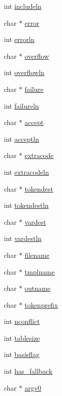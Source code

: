 \begin{DoxyCompactItemize}
\item 
int \hyperlink{structlemon_ac04c5942002ee2221e33a432823c8e21}{includeln}
\item 
char $\ast$ \hyperlink{structlemon_a294f54d8e2db01b97128787f4fcaf663}{error}
\item 
int \hyperlink{structlemon_a4c5c22017ce6a6349580508013f0fef8}{errorln}
\item 
char $\ast$ \hyperlink{structlemon_a9e2f1ac643c894788e3833d66cf96467}{overflow}
\item 
int \hyperlink{structlemon_acc8a35189944152a02bbf4fc07911089}{overflowln}
\item 
char $\ast$ \hyperlink{structlemon_a2c5a51191c4df555486145f8d4a2d655}{failure}
\item 
int \hyperlink{structlemon_a1dca070f96c372bb30989cfc29b59485}{failureln}
\item 
char $\ast$ \hyperlink{structlemon_ae26bcb5ffb57001afb97871a54a4013e}{accept}
\item 
int \hyperlink{structlemon_a0bd3f987e1b5b51e4fefde9c9ff44e17}{acceptln}
\item 
char $\ast$ \hyperlink{structlemon_ac4795352f79823338f9eb6861e996b24}{extracode}
\item 
int \hyperlink{structlemon_ab9289aa74679e3a53540eefebd30484e}{extracodeln}
\item 
char $\ast$ \hyperlink{structlemon_a13e8e51c24bb346fd0d4130037e47674}{tokendest}
\item 
int \hyperlink{structlemon_a2cd0d2dca6fa9656edde10e519bee495}{tokendestln}
\item 
char $\ast$ \hyperlink{structlemon_a218d36617729ba9fda8ff23c6134808c}{vardest}
\item 
int \hyperlink{structlemon_aa924e36c604bf2f4478808693c3f06f0}{vardestln}
\item 
char $\ast$ \hyperlink{structlemon_a2b5f99613de48854dc417a6ad07efc71}{filename}
\item 
char $\ast$ \hyperlink{structlemon_acd2bfd77e462d13f75fb6d85bce8ee8d}{tmplname}
\item 
char $\ast$ \hyperlink{structlemon_a6f5387bcd6ed98e3e0455b4ef410b699}{outname}
\item 
char $\ast$ \hyperlink{structlemon_a745b25b33fa6f9843f714959e57249cd}{tokenprefix}
\item 
int \hyperlink{structlemon_a32cffc536c6549297e55b847d6ace646}{nconflict}
\item 
int \hyperlink{structlemon_ad52146abb13487cb1a6fa9ea9e53debd}{tablesize}
\item 
int \hyperlink{structlemon_a0052dcc4fbedb0f8bd3ccaef3f7d3c5f}{basisflag}
\item 
int \hyperlink{structlemon_ab293971f89301abe2caef589f8c2e259}{has\-\_\-fallback}
\item 
char $\ast$ \hyperlink{structlemon_a7198552f1e854047e0bdc05b81754191}{argv0}
\end{DoxyCompactItemize}


